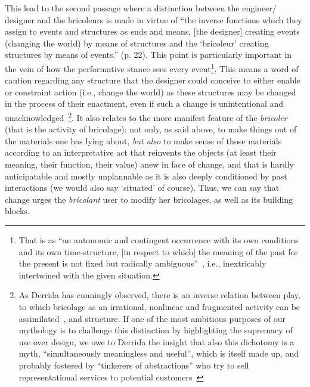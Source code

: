 \documentclass{article}
\begin{document}
This lead to the second passage where a distinction between the engineer/ designer and the bricoleurs is made in virtue of ``the inverse functions which they assign to events and structures as ends and means, [the designer] creating events (changing the world) by means of structures and the `bricoleur' creating structures by means of events.'' (p. 22). This point is particularly important in the vein of how the performative stance sees every event\footnote{That is as ``an autonomic and contingent occurrence with its own conditions and its own time-structure, [in respect to which] the meaning of the past for the present is not fixed but radically ambiguous''~\citep{dirksmeier_time_2008}, i.e., inextricably intertwined with the given situation.}. This means a word of caution regarding any structure that the designer could conceive to either enable or constraint action (i.e., change the world) as these structures may be changed in the process of their enactment, even if such a change is unintentional and unacknowledged~\citep{orlikowski_improvising_1996}\footnote{As Derrida has cunningly observed, there is an inverse relation between play, to which bricolage as an irrational, nonlinear and fragmented activity can be assimilated~\citep{pohn_cosmicplay.net_2007}, and structure. 
If one of the most ambitious purposes of our mythology is to challenge this distinction by highlighting the supremacy of use over design, we owe to Derrida the insight that also this dichotomy is a myth, ``simultaneously meaningless and useful''\citep{pohn_cosmicplay.net_2007}, which is itself made up, and probably fostered by ``tinkerers of abstractions'' who try to sell representational services to potential customers~\citep{robinson_questioning_1991,nandhakumar_fiction_1999}}. It also relates to the more manifest feature of the \emph{bricoler} (that is the activity of bricolage): not only, as said above, to make things out of the materials one has lying about, \emph{but also} to make sense of those materials according to an interpretative act that reinvents the objects (at least their meaning, their function, their value) anew in face of change, and that is hardly anticipatable and mostly unplannable as it is also deeply conditioned by past interactions (we would also say `situated' of course). Thus, we can say that change urges the \emph{bricolant} user to modify her bricolages, as well as its building blocks. 
\end{document}
